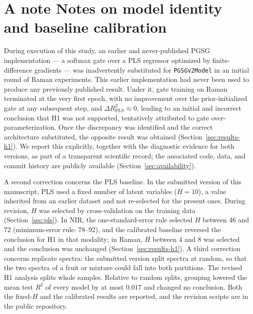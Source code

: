 \documentclass[preprint,12pt]{elsarticle}
\providecommand{\DIFaddtex}[1]{{\protect\color{blue} \sf #1}} %
\providecommand{\DIFdeltex}[1]{{\protect\color{red} \scriptsize #1}} %
\providecommand{\DIFaddbegin}{} %
\providecommand{\DIFaddend}{} %
\providecommand{\DIFdelbegin}{} %
\providecommand{\DIFdelend}{} %
\providecommand{\DIFadd}[1]{\texorpdfstring{\DIFaddtex{#1}}{#1}} %
\providecommand{\DIFdel}[1]{\texorpdfstring{\DIFdeltex{#1}}{}} %
\providecommand{\DIFscaledelfig}{0.5}
\newlength{\DIFdelgraphicswidth} %
\newlength{\DIFdelgraphicsheight} %
\providecommand{\DIFaddincludegraphics}[2][]{{\color{blue}\fbox{\DIFOincludegraphics[#1]{#2}}}} %
\providecommand{\DIFdelincludegraphics}[2][]{%
\sbox{\DIFdelgraphicsbox}{\DIFOincludegraphics[#1]{#2}}%
\settoboxwidth{\DIFdelgraphicswidth}{\DIFdelgraphicsbox} %
\settoboxtotalheight{\DIFdelgraphicsheight}{\DIFdelgraphicsbox} %
\scalebox{\DIFscaledelfig}{%
\parbox[b]{\DIFdelgraphicswidth}{\usebox{\DIFdelgraphicsbox}\\[-\baselineskip] \rule{\DIFdelgraphicswidth}{0em}}\llap{\resizebox{\DIFdelgraphicswidth}{\DIFdelgraphicsheight}{%
\setlength{\unitlength}{\DIFdelgraphicswidth}%
\begin{picture}(1,1)%
\thicklines\linethickness{2pt} %
{\color[rgb]{1,0,0}\put(0,0){\framebox(1,1){}}}%
{\color[rgb]{1,0,0}\put(0,0){\line( 1,1){1}}}%
{\color[rgb]{1,0,0}\put(0,1){\line(1,-1){1}}}%
\end{picture}%
}\hspace*{3pt}}} %
} %
\DeclareRobustCommand{\DIFaddbegin}{\DIFOaddbegin \let\includegraphics\DIFaddincludegraphics} %
\DeclareRobustCommand{\DIFaddend}{\DIFOaddend \let\includegraphics\DIFOincludegraphics} %
\DeclareRobustCommand{\DIFdelbegin}{\DIFOdelbegin \let\includegraphics\DIFdelincludegraphics} %
\DeclareRobustCommand{\DIFdelend}{\DIFOaddend \let\includegraphics\DIFOincludegraphics} %
\begin{document}
\section{\DIFdelbegin \DIFdel{A note }\DIFdelend \DIFaddbegin \DIFadd{Notes }\DIFaddend on model identity \DIFaddbegin \DIFadd{and baseline calibration}\DIFaddend }
\label{sec:model-identity}

During execution of this study, an earlier and never-published PGSG implementation --- a softmax gate over a PLS regressor optimized by finite-difference gradients --- was inadvertently substituted for \texttt{PGSGv2Model} in an initial round of Raman experiments. This earlier implementation had never been used to produce any previously published result. Under it, gate training on Raman terminated at the very first epoch, with no improvement over the prior-initialized gate at any subsequent step, and $\Delta R^{2}_{\mathrm{PLS}}\approx0$, leading to an initial and incorrect conclusion that H1 was not supported, tentatively attributed to gate over-parameterization. Once the discrepancy was identified and the correct architecture substituted, the opposite result was obtained (Section~\ref{sec:results-h1}). We report this explicitly, together with the diagnostic evidence for both versions, as part of a transparent scientific record; the associated code, data, and commit history are publicly available (Section~\ref{sec:availability}).

\DIFaddbegin \DIFadd{A second correction concerns the PLS baseline. In the submitted version of this manuscript, PLS used a fixed number of latent variables ($H=10$), a value inherited from an earlier dataset and not re-selected for the present ones. During revision, $H$ was selected by cross-validation on the training data (Section~\ref{sec:pls}). In NIR, the one-standard-error rule selected $H$ between 46 and 72 (minimum-error rule: 78--92), and the calibrated baseline reversed the conclusion for H1 in that modality; in Raman, $H$ between 4 and 8 was selected and the conclusion was unchanged (Section~\ref{sec:results-h1}). A third correction concerns replicate spectra: the submitted version split spectra at random, so that the two spectra of a fruit or mixture could fall into both partitions. The revised H1 analysis splits whole samples. Relative to random splits, grouping lowered the mean test $R^{2}$ of every model by at most $0.017$ and changed no conclusion. Both the fixed-$H$ and the calibrated results are reported, and the revision scripts are in the public repository.
}
\end{document}
